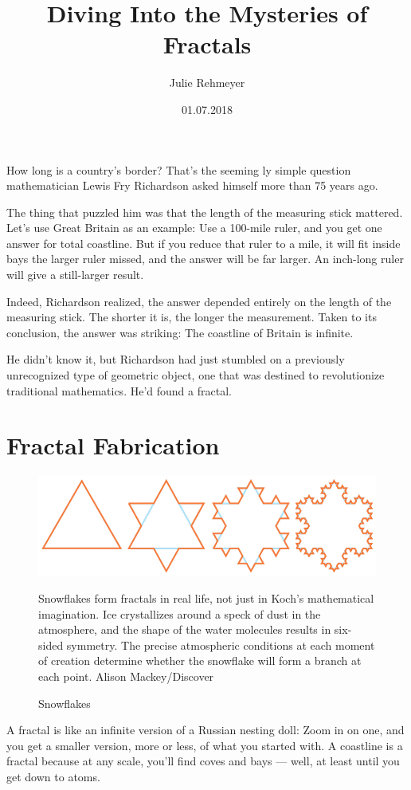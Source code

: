 \documentclass{article}
\title{Diving Into the Mysteries of Fractals}
\author{Julie Rehmeyer}
\date{01.07.2018}
\begin{document}
\maketitle
How long is a country’s border? That’s the seeming	ly simple question mathematician Lewis Fry Richardson asked himself more than 75 years ago.  \vspace{0.4cm}

The thing that puzzled him was that the length of the measuring stick mattered. Let’s use Great Britain as an example: Use a 100-mile ruler, and you get one answer for total coastline. But if you reduce that ruler to a mile, it will fit inside bays the larger ruler missed, and the answer will be far larger. An inch-long ruler will give a still-larger result.  \vspace{0.4cm}

Indeed, Richardson realized, the answer depended entirely on the length of the measuring stick. The shorter it is, the longer the measurement. Taken to its conclusion, the answer was striking: The coastline of Britain is infinite.  \vspace{0.4cm}

He didn’t know it, but Richardson had just stumbled on a previously unrecognized type of geometric object, one that was destined to revolutionize traditional mathematics. He’d found a fractal.
\section{Fractal Fabrication}
\begin{figure}[H]
\includegraphics[scale=0.43]{snowflakes.jpg}
\caption{Snowflakes}{Snowflakes form fractals in real life, not just in Koch’s mathematical imagination. Ice crystallizes around a speck of dust in the atmosphere, and the shape of the water molecules results in six-sided symmetry. The precise atmospheric conditions at each moment of creation determine whether the snowflake will form a branch at each point. Alison Mackey/Discover}
\end{figure}
A fractal is like an infinite version of a Russian nesting doll: Zoom in on one, and you get a smaller version, more or less, of what you started with. A coastline is a fractal because at any scale, you’ll find coves and bays — well, at least until you get down to atoms.
\end{document}
